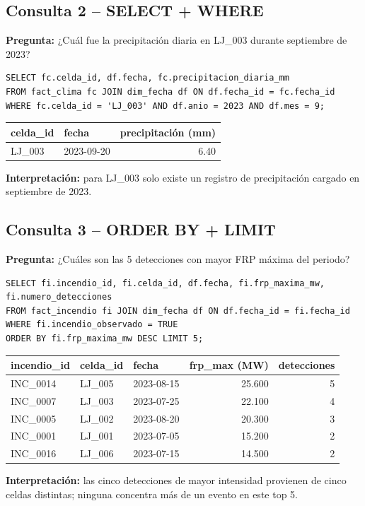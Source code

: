 \documentclass[11pt,a4paper]{article}
\begin{document}
\subsection*{Consulta 2 -- SELECT + WHERE}
\textbf{Pregunta:} ¿Cu\'al fue la precipitaci\'on diaria en LJ\_003 durante septiembre de 2023?
\begin{scriptsize}
\begin{verbatim}
SELECT fc.celda_id, df.fecha, fc.precipitacion_diaria_mm
FROM fact_clima fc JOIN dim_fecha df ON df.fecha_id = fc.fecha_id
WHERE fc.celda_id = 'LJ_003' AND df.anio = 2023 AND df.mes = 9;
\end{verbatim}
\end{scriptsize}
\vspace{-4pt}
\begin{center}\scriptsize
\begin{tabular}{@{}llr@{}}
\toprule
\textbf{celda\_id} & \textbf{fecha} & \textbf{precipitaci\'on (mm)} \\
\midrule
LJ\_003 & 2023-09-20 & 6.40 \\
\bottomrule
\end{tabular}
\end{center}
\vspace{-4pt}
\textbf{Interpretaci\'on:} para LJ\_003 solo existe un registro de precipitaci\'on cargado en
septiembre de 2023.

\subsection*{Consulta 3 -- ORDER BY + LIMIT}
\textbf{Pregunta:} ¿Cu\'ales son las 5 detecciones con mayor FRP m\'axima del periodo?
\begin{scriptsize}
\begin{verbatim}
SELECT fi.incendio_id, fi.celda_id, df.fecha, fi.frp_maxima_mw, fi.numero_detecciones
FROM fact_incendio fi JOIN dim_fecha df ON df.fecha_id = fi.fecha_id
WHERE fi.incendio_observado = TRUE
ORDER BY fi.frp_maxima_mw DESC LIMIT 5;
\end{verbatim}
\end{scriptsize}
\vspace{-4pt}
\begin{center}\scriptsize
\begin{tabular}{@{}lllrr@{}}
\toprule
\textbf{incendio\_id} & \textbf{celda\_id} & \textbf{fecha} & \textbf{frp\_max (MW)} & \textbf{detecciones} \\
\midrule
INC\_0014 & LJ\_005 & 2023-08-15 & 25.600 & 5 \\
INC\_0007 & LJ\_003 & 2023-07-25 & 22.100 & 4 \\
INC\_0005 & LJ\_002 & 2023-08-20 & 20.300 & 3 \\
INC\_0001 & LJ\_001 & 2023-07-05 & 15.200 & 2 \\
INC\_0016 & LJ\_006 & 2023-07-15 & 14.500 & 2 \\
\bottomrule
\end{tabular}
\end{center}
\vspace{-4pt}
\textbf{Interpretaci\'on:} las cinco detecciones de mayor intensidad provienen de cinco celdas
distintas; ninguna concentra m\'as de un evento en este top 5.
\end{document}
